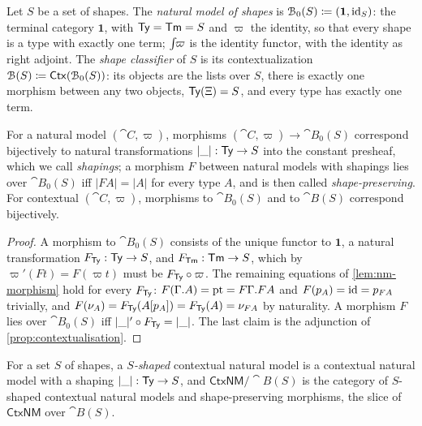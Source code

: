 \begin{definition}\label{def:shape-classifier}
    Let $S$ be a set of shapes. The \emph{natural model of shapes} is $\mathcal{B}_0(S) \coloneqq (\mathbf{1}, \mathrm{id}_S)$: the terminal category $\mathbf{1}$, with $\mathsf{Ty} = \mathsf{Tm} = S$ and $\varpi$ the identity, so that every shape is a type with exactly one term; $\int\!\!\varpi$ is the identity functor, with the identity as right adjoint. The \emph{shape classifier} of $S$ is its contextualization $\mathcal{B}(S) \coloneqq \mathsf{Ctx}(\mathcal{B}_0(S))$: its objects are the lists over $S$, there is exactly one morphism between any two objects, $\mathsf{Ty}(\Xi) = S$, and every type has exactly one term.
\end{definition}

\begin{lemma}\label{lem:shaping}
    For a natural model $(\cat{C}, \varpi)$, morphisms $(\cat{C}, \varpi) \to \cat{B}_0(S)$ correspond bijectively to natural transformations $|\_| : \mathsf{Ty} \to S$ into the constant presheaf, which we call \emph{shapings}; a morphism $F$ between natural models with shapings lies over $\cat{B}_0(S)$ iff $|FA| = |A|$ for every type $A$, and is then called \emph{shape-preserving}. For contextual $(\cat{C}, \varpi)$, morphisms to $\cat{B}_0(S)$ and to $\cat{B}(S)$ correspond bijectively.
\end{lemma}

\begin{proof}
    A morphism to $\cat{B}_0(S)$ consists of the unique functor to $\mathbf{1}$, a natural transformation $F_{\mathsf{Ty}} : \mathsf{Ty} \to S$, and $F_{\mathsf{Tm}} : \mathsf{Tm} \to S$, which by $\varpi'(Ft) = F(\varpi t)$ must be $F_{\mathsf{Ty}} \circ \varpi$. The remaining equations of \cref{lem:nm-morphism} hold for every $F_{\mathsf{Ty}}$: $F(\Gamma.A) = \mathrm{pt} = F\Gamma.FA$ and $F(p_A) = \mathrm{id} = p_{FA}$ trivially, and $F(\nu_A) = F_{\mathsf{Ty}}(A[p_A]) = F_{\mathsf{Ty}}(A) = \nu_{FA}$ by naturality. A morphism $F$ lies over $\cat{B}_0(S)$ iff $|\_|' \circ F_{\mathsf{Ty}} = |\_|$. The last claim is the adjunction of \cref{prop:contextualisation}.
\end{proof}

\begin{definition}\label{def:shaped}
    For a set $S$ of shapes, a \emph{$S$-shaped} contextual natural model is a contextual natural model with a shaping $|\_| : \mathsf{Ty} \to S$, and $\mathsf{CtxNM}/\cat{B}(S)$ is the category of $S$-shaped contextual natural models and shape-preserving morphisms, the slice of $\mathsf{CtxNM}$ over $\cat{B}(S)$.
\end{definition}

